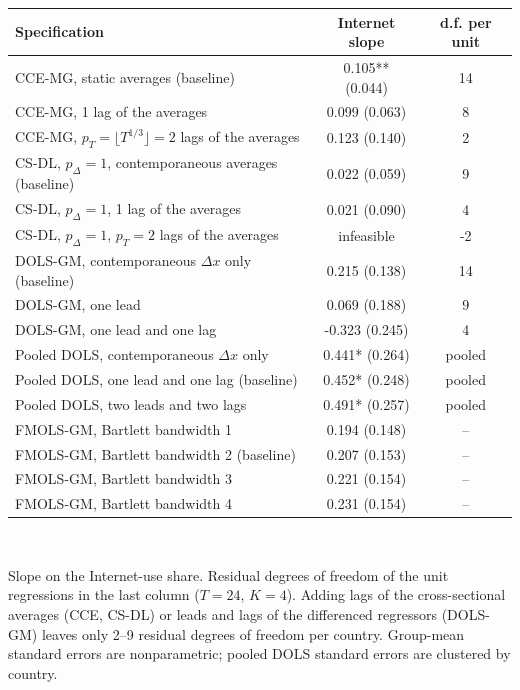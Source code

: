 \begin{tabular}{lcc}\toprule
Specification & Internet slope & d.f. per unit \\
\midrule
CCE-MG, static averages (baseline) & 0.105** (0.044) & 14 \\
CCE-MG, 1 lag of the averages & 0.099 (0.063) & 8 \\
CCE-MG, $p_T=\lfloor T^{1/3}\rfloor=2$ lags of the averages & 0.123 (0.140) & 2 \\
CS-DL, $p_\Delta=1$, contemporaneous averages (baseline) & 0.022 (0.059) & 9 \\
CS-DL, $p_\Delta=1$, 1 lag of the averages & 0.021 (0.090) & 4 \\
CS-DL, $p_\Delta=1$, $p_T=2$ lags of the averages & infeasible & -2 \\
DOLS-GM, contemporaneous $\Delta x$ only (baseline) & 0.215 (0.138) & 14 \\
DOLS-GM, one lead & 0.069 (0.188) & 9 \\
DOLS-GM, one lead and one lag & -0.323 (0.245) & 4 \\
Pooled DOLS, contemporaneous $\Delta x$ only & 0.441* (0.264) & pooled \\
Pooled DOLS, one lead and one lag (baseline) & 0.452* (0.248) & pooled \\
Pooled DOLS, two leads and two lags & 0.491* (0.257) & pooled \\
FMOLS-GM, Bartlett bandwidth 1 & 0.194 (0.148) & -- \\
FMOLS-GM, Bartlett bandwidth 2 (baseline) & 0.207 (0.153) & -- \\
FMOLS-GM, Bartlett bandwidth 3 & 0.221 (0.154) & -- \\
FMOLS-GM, Bartlett bandwidth 4 & 0.231 (0.154) & -- \\
\bottomrule\end{tabular}
\\[3pt]\begin{minipage}{\tablewidth}\footnotesize Slope on the Internet-use share. Residual degrees of freedom of the unit regressions in the last column ($T=24$, $K=4$). Adding lags of the cross-sectional averages (CCE, CS-DL) or leads and lags of the differenced regressors (DOLS-GM) leaves only 2--9 residual degrees of freedom per country. Group-mean standard errors are nonparametric; pooled DOLS standard errors are clustered by country.\end{minipage}
